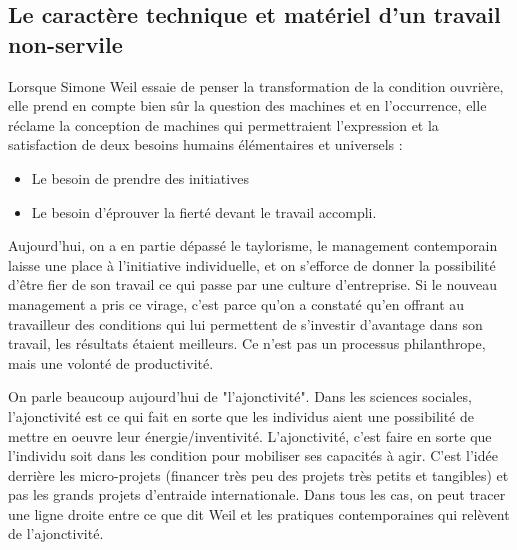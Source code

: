 \documentclass[a4paper,12pt]{book}
\begin{document}
\subsection{Le caractère technique et matériel d'un travail non-servile}
Lorsque Simone Weil essaie de penser la transformation de la condition ouvrière, elle prend en compte bien sûr la question des machines et en l'occurrence, elle réclame la conception de machines qui permettraient l'expression et la satisfaction de deux besoins humains élémentaires et universels :\begin{itemize}
\item Le besoin de prendre des initiatives
\item Le besoin d'éprouver la fierté devant le travail accompli.
\end{itemize}
Aujourd'hui, on a en partie dépassé le taylorisme, le management contemporain laisse une place à l'initiative individuelle, et on s'efforce de donner la possibilité d'être fier de son travail ce qui passe par une culture d'entreprise. Si le nouveau management a pris ce virage, c'est parce qu'on a constaté qu'en offrant au travailleur des conditions qui lui permettent de s'investir d'avantage dans son travail, les résultats étaient meilleurs. Ce n'est pas un processus philanthrope, mais une volonté de productivité. \par On parle beaucoup aujourd'hui de "l'ajonctivité". Dans les sciences sociales, l'ajonctivité est ce qui fait en sorte que les individus aient une possibilité de mettre en oeuvre leur énergie/inventivité. L'ajonctivité, c'est faire en sorte que l'individu soit dans les condition pour mobiliser ses capacités à agir. C'est l'idée derrière les micro-projets (financer très peu des projets très petits et tangibles) et pas les grands projets d'entraide internationale. Dans tous les cas, on peut tracer une ligne droite entre ce que dit Weil et les pratiques contemporaines qui relèvent de l'ajonctivité.
\end{document}
